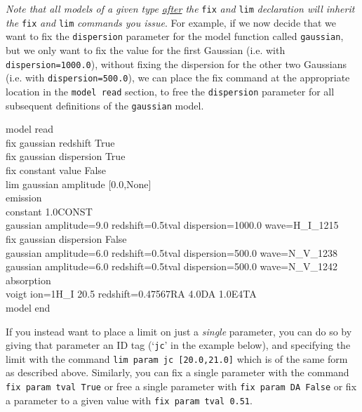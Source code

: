 \textit{Note that all models of a given type \underline{after} the }\texttt{fix}\textit{ and }\texttt{lim}\textit{ declaration
will inherit the }\texttt{fix}\textit{ and }\texttt{lim}\textit{ commands you issue}.
For example, if we now decide that we want to fix the \texttt{dispersion}
parameter for the model function called \texttt{gaussian}, but we only
want to fix the value for the first Gaussian (i.e. with \texttt{dispersion=1000.0}),
without fixing the dispersion for the other two Gaussians
(i.e. with \texttt{dispersion=500.0}), we can place the fix
command at the appropriate location in the \texttt{model read}
section, to free the \texttt{dispersion} parameter for all subsequent
definitions of the \texttt{gaussian} model.

\vspace{0.3cm}
\begin{mdframed}[style=MyFrame]
model read\\
fix gaussian redshift True\\
fix gaussian dispersion True\\
fix constant value False\\
lim gaussian amplitude [0.0,None]\\
emission\\
constant 1.0CONST\\
gaussian amplitude=9.0 redshift=0.5tval dispersion=1000.0 wave=H\_I\_1215\\
fix gaussian dispersion False\\
gaussian amplitude=6.0 redshift=0.5tval dispersion=500.0 wave=N\_V\_1238\\
gaussian amplitude=6.0 redshift=0.5tval dispersion=500.0 wave=N\_V\_1242\\
absorption\\
voigt ion=1H\_I    20.5   redshift=0.47567RA    4.0DA   1.0E4TA\\
model end
\end{mdframed}
\vspace{0.2cm}

If you instead want to place a limit on just a \textit{single} parameter, you can
do so by giving that parameter an ID tag (`\texttt{jc}' in the example below),
and specifying the limit with the command \texttt{lim param jc [20.0,21.0]}
which is of the same form as described above. Similarly, you can fix a single
parameter with the command \texttt{fix param tval True} or free a single
parameter with \texttt{fix param DA False} or fix a parameter to a given
value with \texttt{fix param tval 0.51}.

